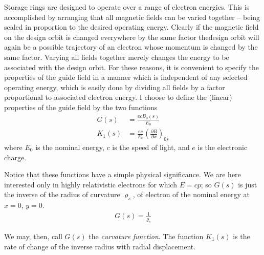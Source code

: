 Storage rings are designed to operate over a range of electron energies. This is accomplished  by arranging that all magnetic fields can be varied together -- being scaled in proportion to the desired operating energy. Clearly if the magnetic field on the design orbit is changed everywhere by the same factor thedesign orbit will again be a possible trajectory of an electron whose momentum is changed by the same factor. Varying all fields together merely changes the energy to be associated with the design orbit. For these reasons, it is convenient to specify the properties of the guide field in a manner which is independent of any selected operating energy, which is easily done by dividing all fields by a factor proportional to associated electron energy. I choose to define the (linear) properties of the guide field by the two functions
\begin{align}\label{eq:2.3}
	G(s) &= \frac{ecB_0(s)}{E_0}\\
	K_1(s) &= \frac{ec}{E_0} \left(\frac{\partial B}{\partial x}\right)_{0s} \label{eq:2.4}
\end{align}
where $E_0$ is the nominal energy, $c$ is the speed of light, and $e$ is the electronic charge.

Notice that these functions have a simple physical significance. We are here interested only in highly relativistic electrons for which $E = cp$; so $G(s)$ is just the inverse of the radius of curvature $\varrho_s$, of electron of the nominal energy at $x = 0$, $y = 0$.
\begin{align}
	G(s) = \frac{1}{\varrho_s}
\end{align}

We may, then, call $G(s)$ the \textit{curvature function}. The function $K_1(s)$ is the rate of change of the inverse radius with radial displacement.

